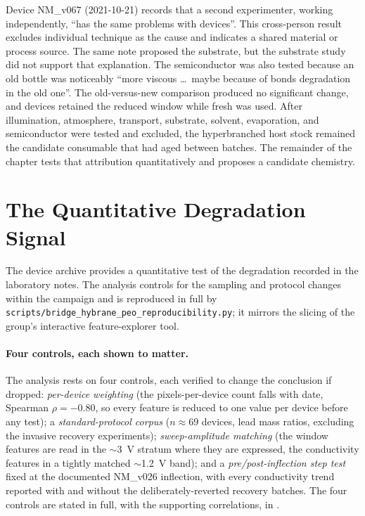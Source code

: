 \documentclass[12pt, twoside]{report}
\begin{document}
Device NM\_v067 (2021-10-21) records that a second experimenter, working independently, ``has the same problems with devices''. This cross-person result excludes individual technique as the cause and indicates a shared material or process source. The same note proposed the \ITO{} substrate, but the substrate study did not support that explanation. The \SY{} semiconductor was also tested because an old bottle was noticeably ``more viscous \ldots\ maybe because of bonds degradation in the old one''. The old-versus-new \SY{} comparison produced no significant change, and devices retained the reduced window while fresh \SY{} was used. After illumination, atmosphere, transport, substrate, solvent, evaporation, and semiconductor were tested and excluded, the hyperbranched \Hybrane{} host stock remained the candidate consumable that had aged between batches. The remainder of the chapter tests that attribution quantitatively and proposes a candidate chemistry.

\FloatBarrier  %
\section{The Quantitative Degradation Signal}\label{sec:bridge_degradation}

The device archive provides a quantitative test of the degradation recorded in the laboratory notes. The analysis controls for the sampling and protocol changes within the campaign and is reproduced in full by \texttt{scripts/\allowbreak bridge\_\allowbreak hybrane\_\allowbreak peo\_\allowbreak reproducibility.py}; it mirrors the slicing of the group's interactive feature-explorer tool.

\paragraph{Four controls, each shown to matter.} The analysis rests on four controls, each verified to change the conclusion if dropped: \emph{per-device weighting} (the pixels-per-device count falls with date, Spearman $\rho=-0.80$, so every feature is reduced to one value per device before any test); a \emph{standard-protocol corpus} ($n\approx69$ devices, lead mass ratios, excluding the invasive recovery experiments); \emph{sweep-amplitude matching} (the window features are read in the $\sim$\SI{3}{\volt} stratum where they are expressed, the conductivity features in a tightly matched $\sim$\SI{1.2}{\volt} band); and a \emph{pre/post-inflection step test} fixed at the documented NM\_v026 inflection, with every conductivity trend reported with and without the deliberately-reverted recovery batches. The four controls are stated in full, with the supporting correlations, in .
\end{document}
